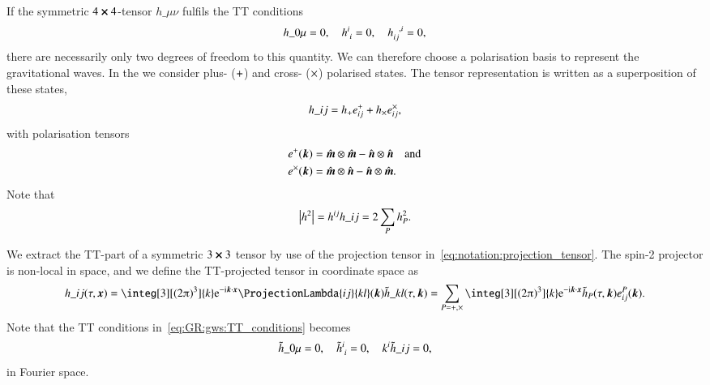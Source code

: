 If the symmetric $4\cross4$-tensor $h\_{\mu\nu}$ fulfils the TT conditions
\begin{equation}\label{eq:GR:gws:TT_conditions}
    h\_{0\mu} = 0, \quad h\indices{^i_i} = 0, \quad h\indices{_{ij}^{,i}}=0,
\end{equation}
there are necessarily only two degrees of freedom to this quantity. %
We can therefore choose a {polarisation basis} to represent the gravitational waves. In the  we consider plus- ($+$) and cross- ($\times$) polarised states.  The tensor representation is written as a superposition of these states,
\begin{equation}
    h\_{ij} = h_\polplus e\indices*{^{\polplus}_{ij}} + h_\polcross e\indices*{^{\polcross}_{ij}},
\end{equation}
with polarisation tensors%
\begin{equation}
    \begin{split}
        e^+  (\boldsymbol{k}) &= \hat{\boldsymbol{m}} \otimes \hat{\boldsymbol{m}} - \hat{\boldsymbol{n}} \otimes \hat{\boldsymbol{n}} \quad \text{and} \\
        e^\times (\boldsymbol{k}) &= \hat{\boldsymbol{m}} \otimes \hat{\boldsymbol{n}} - \hat{\boldsymbol{n}} \otimes \hat{\boldsymbol{m}}.
    \end{split}
\end{equation}
Note that
\begin{equation}
    \abs{h^2 } =  h\^{ij}h\_{ij} = 2 \sum_{P}h_P^2.
\end{equation}


We extract the TT-part of a symmetric $3\cross 3$ tensor by use of the projection tensor in~\cref{eq:notation:projection_tensor}. %
The spin-2 projector is non-local in space, and we define the TT-projected tensor in coordinate space as
\begin{equation}
    h\_{ij}(\tau, \vec{x}) = \integ[3][(2\ppi)^3]{k}  \eu[-\im \vec{k}\cdot \vec{x}] \ProjectionLambda{ij}{kl}(\vec{k}) \Ft{h}\_{kl}(\tau, \vec{k}) =  \sum_{P=\polplus, \polcross} \integ[3][(2\ppi)^3]{k}  \eu[-\im \vec{k}\cdot \vec{x}] \Ft{h}_P(\tau, \vec{k}) e\indices*{^{P}_{ij}}(\vec{k}).
\end{equation}
Note that the TT conditions in~\cref{eq:GR:gws:TT_conditions} becomes
\begin{equation}\label{eq:GR:gws:TT_conditions_Ft}
    \Ft{h}\_{0\mu} = 0, \quad \Ft{h}\indices{^i_i} = 0, \quad k^i \Ft{h}\_{ij}=0,
\end{equation}
in Fourier space.

